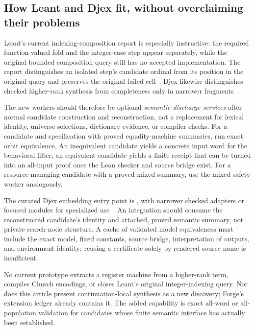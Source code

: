 \subsection{How Leant and Djex fit, without overclaiming their problems}
Leant's current indexing-composition report is especially instructive: the
required function-valued fold and the integer-case step appear separately,
while the original bounded composition query still has no accepted
implementation. The report distinguishes an isolated step's candidate ordinal
from its position in the original query and preserves the original failed
cell~\cite{leant}. Djex likewise distinguishes checked higher-rank synthesis
from completeness only in narrower fragments~\cite{djex}.

The new workers should therefore be optional \emph{semantic discharge services}
after normal candidate construction and reconstruction, not a replacement for
lexical identity, universe selections, dictionary evidence, or compiler checks.
For a candidate and specification with proved equality-machine summaries, run
exact orbit equivalence. An inequivalent candidate yields a concrete input word
for the behavioral filter; an equivalent candidate yields a finite receipt that
can be turned into an all-input proof once the Lean checker and source bridge
exist. For a resource-managing candidate with a proved mixed summary, use the
mixed safety worker analogously.

The curated Djex embedding entry point is
, with narrower checked adapters or focused
 modules for specialized use~\cite{djex}.
An integration should consume the reconstructed candidate's identity and
attached, proved semantic summary, not private search-node structure. A
cache of validated model equivalences must include the exact model, fixed
constants, source bridge, interpretation of outputs, and environment identity;
reusing a certificate solely by rendered source name is insufficient.

No current prototype extracts a register machine from a higher-rank term,
compiles Church encodings, or closes Leant's original integer-indexing query.
Nor does this article present continuation-local synthesis as a new discovery;
Forge's extension ledger already contains it. The added capability is exact
all-word or all-population validation for candidates whose finite semantic
interface has actually been established.

